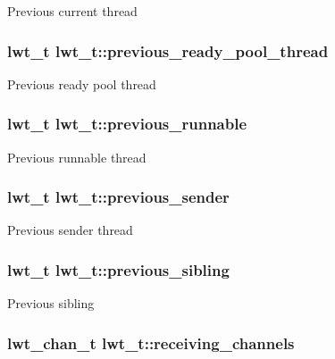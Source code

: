 Previous current thread \hypertarget{structlwt_a86cf2d2c1b778c2649f12626dbe8ea49}{
\subsubsection[{previous\+\_\+ready\+\_\+pool\+\_\+thread}]{\setlength{\rightskip}{0pt plus 5cm}lwt\+\_\+t lwt\+\_\+t\+::previous\+\_\+ready\+\_\+pool\+\_\+thread}}\label{structlwt_a86cf2d2c1b778c2649f12626dbe8ea49}
Previous ready pool thread \hypertarget{structlwt_acb89e009a8cb87cbd5d71ab5ca08911b}{
\subsubsection[{previous\+\_\+runnable}]{\setlength{\rightskip}{0pt plus 5cm}lwt\+\_\+t lwt\+\_\+t\+::previous\+\_\+runnable}}\label{structlwt_acb89e009a8cb87cbd5d71ab5ca08911b}
Previous runnable thread \hypertarget{structlwt_ae9ef76c08e20117f01976c5c7cfb28b9}{
\subsubsection[{previous\+\_\+sender}]{\setlength{\rightskip}{0pt plus 5cm}lwt\+\_\+t lwt\+\_\+t\+::previous\+\_\+sender}}\label{structlwt_ae9ef76c08e20117f01976c5c7cfb28b9}
Previous sender thread \hypertarget{structlwt_a28f05f6ebc974d92415a55b8e190670e}{
\subsubsection[{previous\+\_\+sibling}]{\setlength{\rightskip}{0pt plus 5cm}lwt\+\_\+t lwt\+\_\+t\+::previous\+\_\+sibling}}\label{structlwt_a28f05f6ebc974d92415a55b8e190670e}
Previous sibling \hypertarget{structlwt_ac857ca0e804faec3a2dc17ff1ee0f22d}{
\subsubsection[{receiving\+\_\+channels}]{\setlength{\rightskip}{0pt plus 5cm}lwt\+\_\+chan\+\_\+t lwt\+\_\+t\+::receiving\+\_\+channels}}\label{structlwt_ac857ca0e804faec3a2dc17ff1ee0f22d}
